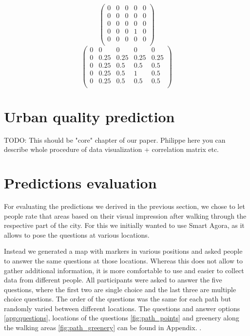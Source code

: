 \documentclass[letterpaper]{article}
\begin{document}
\begin{equation}
\begin{pmatrix}
    0 & 0 & 0 & 0 & 0 \\
    0 & 0 & 0 & 0 & 0 \\
    0 & 0 & 0 & 0 & 0 \\
    0 & 0 & 0 & 1 & 0 \\
    0 & 0 & 0 & 0 & 0 \\
\end{pmatrix}
\label{eq:MatA}
\end{equation}
\begin{equation}
\begin{pmatrix}
    0 & 0 & 0 & 0 & 0 \\
    0 & 0.25 & 0.25 & 0.25 & 0.25 \\
    0 & 0.25 & 0.5 & 0.5 & 0.5 \\
    0 & 0.25 & 0.5 & 1 & 0.5 \\
    0 & 0.25 & 0.5 & 0.5 & 0.5 \\
\end{pmatrix}
\label{eq:MatB}
\end{equation}

\section{Urban quality prediction}\label{sec:predictions}
TODO: This should be "core" chapter of our paper. Philippe here you can describe whole 
procedure of data visualization + correlation matrix etc.

\section{Predictions evaluation}\label{sec:exp}
For evaluating the predictions we derived in the previous section, we chose to let people rate 
that areas based on their visual impression after walking through the respective part of the city. 
For this we initially wanted to use Smart Agora, as it allows to pose the questions at various locations.

Instead we generated a map with markers in various positions and asked people to answer the same questions at those locations. 
Whereas this does not allow to gather additional information, it is more comfortable to use and easier to collect data from 
different people. All participants were asked to answer the five questions, where the first two are single choice 
and the last three are multiple choice questions. The order of the questions was the same for each path but randomly varied 
between different locations. The questions and answer options \ref{app:questions}, locations of the questions \ref{fig:path_points}
and greenery along the walking areas \ref{fig:path_greenery} can be found in Appendix. .
\end{document}
